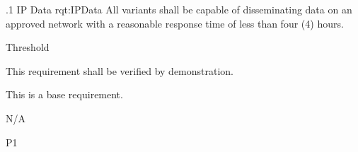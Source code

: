 \ONERQMTVKPP
{\RqtNumberBase.1}
{IP Data}
{rqt:IPData}
{All \ThisSystem variants shall be capable of disseminating data on an approved network with a reasonable response time of less than four (4) hours.}
{
	\item [Phase 1] Threshold
}
{This requirement shall be verified by demonstration.}
{
\item [N/A] This is a base requirement.
}
{
	\item N/A
}
{P1}

